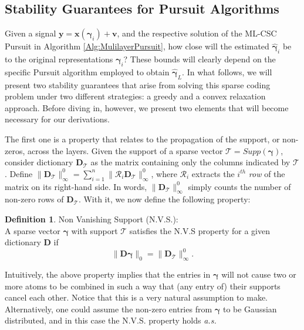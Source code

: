 \documentclass[10pt,journal]{IEEEtran}
\def\x{{\mathbf x}}
\def\v{{\mathbf v}}
\def\y{{\mathbf y}}
\def\D{{\mathbf D}}
\def\gama{{\boldsymbol \gamma}}
\theoremstyle{plain}
\theoremstyle{definition}
\newtheorem{defn}[thm]{Definition} %
\begin{document}
\subsection{Stability Guarantees for Pursuit Algorithms}
\label{sec:StabilityPursuits}
Given a signal $\y = \x(\gama_i) + \v$, and the respective solution of the ML-CSC Pursuit in Algorithm \ref{Alg:MulilayerPursuit}, how close will the estimated $\hat{\gama}_i$ be to the original representations $\gama_i$? These bounds will clearly depend on the specific Pursuit algorithm employed to obtain $\hat{\gama}_L$. In what follows, we will present two stability guarantees that arise from solving this sparse coding problem under two different strategies: a greedy and a convex relaxation approach. Before diving in, however, we present two elements that will become necessary for our derivations. 

The first one is a property that relates to the propagation of the support, or non-zeros, across the layers. Given the support of a sparse vector $\mathcal{T} = Supp(\gama)$, consider dictionary $\D_\mathcal{T}$ as the matrix containing only the columns indicated by $\mathcal{T}$. Define $\|\D_\mathcal{T}\|^0_{\infty} = \sum_{i=1}^{n} \|\mathcal{R}_i \D_\mathcal{T}\|^0_{\infty}$, where $\mathcal{R}_i$ extracts the $i^{th}$ \emph{row} of the matrix on its right-hand side. In words, $\|\D_\mathcal{T}\|^0_{\infty}$ simply counts the number of non-zero rows of $\D_\mathcal{T}$. With it, we now define the following property:

\begin{defn}{Non Vanishing Support (N.V.S.):}\\
	A sparse vector $\gama$ with support $\mathcal{T}$ satisfies the N.V.S property for a given dictionary $\D$ if 
	\begin{equation}
		\| \D \gama \|_0 = \|\D_\mathcal{T}\|^0_{\infty}.
	\end{equation}
	\label{def:N.V.S.Property}
\end{defn}
Intuitively, the above property implies that the entries in $\gama$ will not cause two or more atoms to be combined in such a way that (any entry of) their supports cancel each other. Notice that this is a very natural assumption to make. %
Alternatively, one could assume the non-zero entries from $\gama$ to be Gaussian distributed, and in this case the N.V.S. property holds \emph{a.s.}
\end{document}
